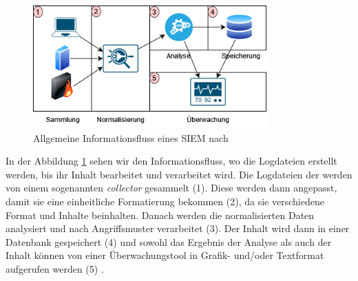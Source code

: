 \begin{figure}[H]
   \centering
   \includegraphics[width=0.8\textwidth]{assets/InfoFluss_SIEM.png}
   \caption[Allgemeine Informationsfluss von \gls{SIEM}]
   {Allgemeine Informationsfluss eines \gls{SIEM} nach \cite{Granadillo_SIEM} }
   \label{fig:SIEM_Allg_Informationsfluss}
   \centering
\end{figure}



In der Abbildung \ref{fig:SIEM_Allg_Informationsfluss} sehen wir den Informationsfluss, wo die Logdateien erstellt werden, bis ihr Inhalt bearbeitet und verarbeitet wird. Die Logdateien der  werden von einem sogenannten \textit{collector} gesammelt (1). Diese werden dann angepasst, damit sie eine einheitliche Formatierung bekommen (2), da sie verschiedene Format und Inhalte beinhalten. Danach werden die normalisierten Daten analysiert und nach Angriffsmuster verarbeitet (3). Der Inhalt wird dann in einer Datenbank gespeichert (4) und sowohl das Ergebnis der Analyse als auch der Inhalt können von einer Überwachungstool in Grafik- und/oder Textformat aufgerufen werden (5) \cite{Granadillo_SIEM}. 





